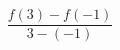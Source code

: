 \documentclass[preview]{standalone}
\begin{document}
\begin{align*}
\dfrac{f(3) - f(-1)}{3 - (-1)}
\end{align*}
\end{document}
